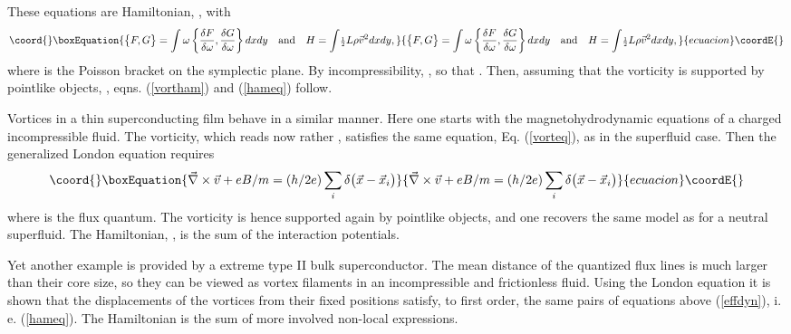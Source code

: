 \documentclass[a4paper,12pt]{article}
\providecommand\half{{\scriptstyle{\frac{1}{2}}}}
\providecommand{\vx}{{\vec x}}
\providecommand{\vv}{{\vec v}}
\providecommand{\vnabla}{{\vec\nabla}}
\begin{document}
These equations are Hamiltonian,
\coordHE{}, with 
\begin{equation}\coord{}\boxEquation{
    \big\{F,G\big\}=\int\omega\left\{\frac{\delta F}{\delta\omega},
    \frac{\delta G}{\delta\omega}\right\}dxdy
    \quad\hbox{and}\quad
    H=\int\!
    \half L\rho\vv^2dxdy,
\label{Hamstruct}
}{
    \big\{F,G\big\}=\int\omega\left\{\frac{\delta F}{\delta\omega},
    \frac{\delta G}{\delta\omega}\right\}dxdy
    \quad\hbox{and}\quad
    H=\int\!
    \half L\rho\vv^2dxdy,
}{ecuacion}\coordE{}\end{equation}
where \myHighlight{$\big\{\cdot,\cdot\big\}$}\coordHE{} is the 
Poisson bracket on the symplectic plane. By incompressibility,
\myHighlight{$\vv=\vnabla\times\psi$}\coordHE{}, so that \coordHE{}.
Then, assuming that the vorticity is supported by pointlike objects, 
\myHighlight{$\omega=\sum_{i}\kappa\delta(\vx-\vx_{i})$}\coordHE{}, 
eqns. (\ref{vortham}) and (\ref{hameq}) follow.

Vortices in a thin superconducting film 
behave in a similar manner\cite{Fetter}.
Here one starts with the  magnetohydrodynamic equations
\myHighlight{$
\dot{v}_{i}-\epsilon_{ij}v_{j}\vnabla\times\vv
=(e/m)\big(E_{i}+\epsilon_{ij}v_{j}B\big)
$}\coordHE{}
of  a charged incompressible fluid.
The vorticity, which reads now rather \myHighlight{$\omega=\vnabla\times\vv+eB/m$}\coordHE{}, 
satisfies the same equation, Eq. (\ref{vorteq}), as in the superfluid 
case. Then the generalized London equation  requires
\begin{equation}\coord{}\boxEquation{
    \vnabla\times\vv+eB/m=(h/2e)\sum_{i}\delta\big(\vx-\vx_{i}\big)
    \label{London}
}{
    \vnabla\times\vv+eB/m=(h/2e)\sum_{i}\delta\big(\vx-\vx_{i}\big)
    }{ecuacion}\coordE{}\end{equation}
where \coordHE{} is the flux quantum. The vorticity is hence supported
again by pointlike objects, and
one recovers the same model as for a neutral superfluid.
The Hamiltonian, \coordHE{}, is the sum of the interaction 
potentials\cite{Fetter}. 

Yet another example is provided by
a  extreme type II bulk superconductor\cite{Fetter}. 
The mean distance of the quantized flux lines
is much larger than their core size, so they can be viewed as
 vortex filaments in an incompressible and frictionless fluid.
 Using the London equation it is shown\cite{Fetter} that
 the displacements of the vortices from their
 fixed positions satisfy, to first order, 
 the same pairs of equations above (\ref{effdyn}), i. e.
(\ref{hameq}). The Hamiltonian is the sum of more involved
non-local expressions\cite{Fetter}. 
\goodbreak
\end{document}
